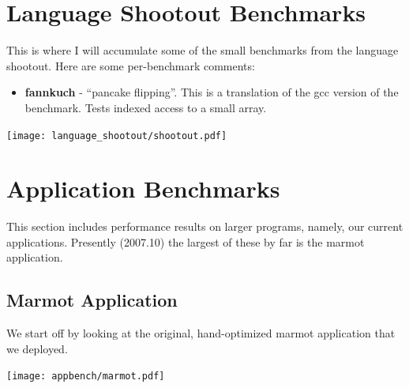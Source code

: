 \documentclass{article}
\begin{document}
\section{Language Shootout Benchmarks}

This is where I will accumulate some of the small benchmarks from the
language shootout.  Here are some per-benchmark comments:

\begin{itemize}
\item {\bf fannkuch} - ``pancake flipping''.  This is a translation of the
  gcc version of the benchmark.  Tests indexed access to a small array.
\end{itemize}

\begin{center}
\texttt{[image: language\_shootout/shootout.pdf]}
\end{center}



\section{Application Benchmarks}

This section includes performance results on larger programs, namely, our
current applications.  Presently (2007.10) the largest of these by far
is the marmot application.

\subsection{Marmot Application}

We start off by looking at the original, hand-optimized marmot
application that we deployed.

\begin{center}
\texttt{[image: appbench/marmot.pdf]}
\end{center}

\end{document}
